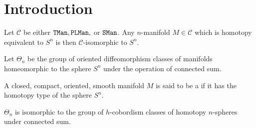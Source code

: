 \chapter{Introduction}


\begin{conjecture} Let $\mathscr{C}$ be either $\mathtt{TMan}, \mathtt{PLMan},$ or $\mathtt{SMan}$. Any $n$-manifold $M\in \mathscr{C}$ which is homotopy equivalent to $S^n$ is then $\mathscr{C}$-isomorphic to $S^n$.
\end{conjecture}

\begin{definition}
  Let $\Theta_n$ be the group of oriented diffeomorphism classes of manifolds homeomorphic to the sphere $S^n$ under the operation of connected sum.
\end{definition}

\begin{definition}
  A closed, compact, oriented, smooth manifold $M$ is said to be a  if it has the homotopy type of the sphere $S^n$.
\end{definition}

\begin{theorem}
  $\Theta_n$ is isomorphic to the group of $h$-cobordism classes of homotopy $n$-spheres under connected sum.
\end{theorem}
